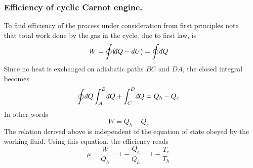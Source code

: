 \documentclass[../../../Main.tex]{subfiles}
\begin{document}
\subsubsection{Efficiency of cyclic Carnot engine.} To find efficiency of the process under consideration from first principles note that total work done by the gas in the cycle, due to first law, is
\begin{equation*}
    W=\oint(\dbar Q-dU)=\oint \dbar Q
\end{equation*}
Since no heat is exchanged on adiabatic paths $BC$ and $DA$, the closed integral becomes 
\begin{equation*}
    \oint \dbar Q\int_{A}^{B} \dbar Q+\int_{C}^{D} \dbar Q=Q_h-Q_c
\end{equation*}
In other words
\begin{equation*}
    W=Q_h-Q_c
\end{equation*}
The relation derived above is independent of the equation of state obeyed by the working fluid. Using this equation, the efficiency reads 
\begin{equation*}
    \mu=\frac{W}{Q_h}=1-\frac{Q_c}{Q_h}=1-\frac{T_c}{T_h}
\end{equation*}
\end{document}
